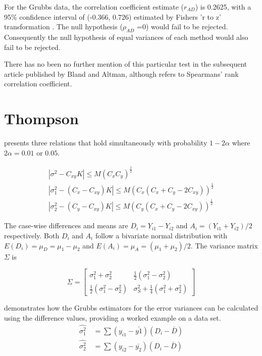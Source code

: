 \documentclass[12pt, a4paper]{report}
\theoremstyle{plain}
\theoremstyle{definition}
\theoremstyle{remark}
\begin{document}
	For the Grubbs data, the correlation coefficient estimate
	($r_{AD}$) is 0.2625, with a 95\% confidence interval of (-0.366,
	0.726) estimated by Fishers 'r to z' transformation \citep{Cohen}.
	The null hypothesis ($\rho_{AD}$ =0) would fail to be rejected.
	Consequently the null hypothesis of equal variances of each method
	would also fail to be rejected.
	
	There has no been no further mention of this particular test in
	the subsequent article published by Bland and Altman, although
	\citet{BA99} refers to Spearmans' rank correlation coefficient.
	
	
	

	\section{Thompson}
	\citet{Thompson} presents three relations that hold simultaneously
	with probability $1-2\alpha$ where $2\alpha=0.01$ or $0.05$.
	
	\begin{eqnarray}
	|\sigma^2-C_{xy}K|\leqslant M(C_{x}C_{y})^{\frac{1}{2}}\\
	|\sigma^2_{1}-(C_{x}-C_{xy})K|\leqslant M(C_{x}(C_{x}+C_{y}-2C_{xy}))^{\frac{1}{2}}\nonumber\\
	|\sigma^2_{2}-(C_{y}-C_{xy})K|\leqslant
	M(C_{y}(C_{x}+C_{y}-2C_{xy}))^{\frac{1}{2}}\nonumber
	\end{eqnarray}
	
	The case-wise differences and means are $D_{i} = Y_{i1}-Y_{i2}$
	and $A_{i} = (Y_{i1}+Y_{i2})/2$  respectively. Both $D_{i}$ and
	$A_{i}$ follow a bivariate normal distribution with $E(D_{i})=
	\mu_{D} = \mu_{1} - \mu_{2}$ and $E(A_{i})= \mu_{A} = (\mu_{1} +
	\mu_{2})/2$. The variance matrix $\Sigma$ is
	
	\begin{equation}
	\Sigma = \left[\begin{matrix}
	\sigma^{2}_{1}+\sigma^{2}_{2}&\frac{1}{2}(\sigma^{2}_{1}-\sigma^{2}_{2})\\
	\frac{1}{2}(\sigma^{2}_{1}-\sigma^{2}_{2})&\sigma^{2}_{S}+
	\frac{1}{4}(\sigma^{2}_{1}+\sigma^{2}_{2})
	\end{matrix} \right]
	\end{equation}
	
	
	
	
	
	\citet{Kinsella} demonstrates how the Grubbs estimators for the
	error variances can be calculated using the difference values,
	providing a worked example on a data set.
	\begin{eqnarray}
	\hat{\sigma^{2}_{1}}
	\quad=\sum{(y_{i1}-\bar{y{1}})(D_{i}-\bar{D})}\\
	\hat{\sigma^{2}_{2}} \quad=
	\sum{(y_{i2}-\bar{y_{2}})(D_{i}-\bar{D})} \nonumber
	\end{eqnarray}
\end{document}
